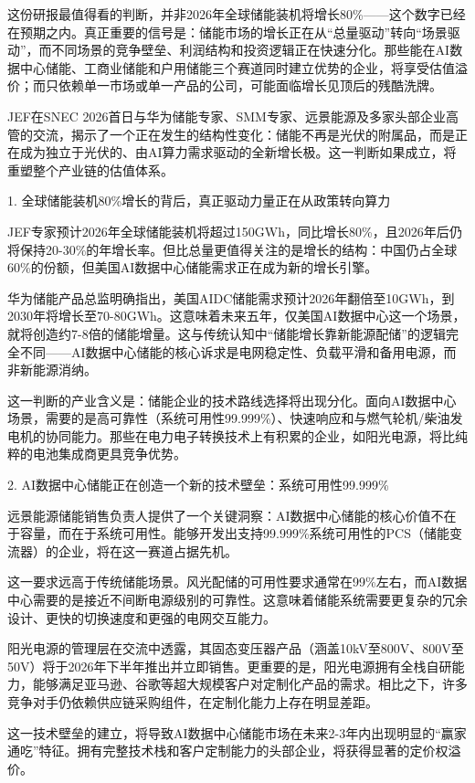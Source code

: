 \documentclass[11pt]{ctexart}
\begin{document}
这份研报最值得看的判断，并非2026年全球储能装机将增长80\%——这个数字已经在预期之内。真正重要的信号是：储能市场的增长正在从“总量驱动”转向“场景驱动”，而不同场景的竞争壁垒、利润结构和投资逻辑正在快速分化。那些能在AI数据中心储能、工商业储能和户用储能三个赛道同时建立优势的企业，将享受估值溢价；而只依赖单一市场或单一产品的公司，可能面临增长见顶后的残酷洗牌。

JEF在SNEC 2026首日与华为储能专家、SMM专家、远景能源及多家头部企业高管的交流，揭示了一个正在发生的结构性变化：储能不再是光伏的附属品，而是正在成为独立于光伏的、由AI算力需求驱动的全新增长极。这一判断如果成立，将重塑整个产业链的估值体系。

1. 全球储能装机80\%增长的背后，真正驱动力量正在从政策转向算力

JEF专家预计2026年全球储能装机将超过150GWh，同比增长80\%，且2026年后仍将保持20-30\%的年增长率。但比总量更值得关注的是增长的结构：中国仍占全球60\%的份额，但美国AI数据中心储能需求正在成为新的增长引擎。

华为储能产品总监明确指出，美国AIDC储能需求预计2026年翻倍至10GWh，到2030年将增长至70-80GWh。这意味着未来五年，仅美国AI数据中心这一个场景，就将创造约7-8倍的储能增量。这与传统认知中“储能增长靠新能源配储”的逻辑完全不同——AI数据中心储能的核心诉求是电网稳定性、负载平滑和备用电源，而非新能源消纳。

这一判断的产业含义是：储能企业的技术路线选择将出现分化。面向AI数据中心场景，需要的是高可靠性（系统可用性99.999\%）、快速响应和与燃气轮机/柴油发电机的协同能力。那些在电力电子转换技术上有积累的企业，如阳光电源，将比纯粹的电池集成商更具竞争优势。

2. AI数据中心储能正在创造一个新的技术壁垒：系统可用性99.999\%

远景能源储能销售负责人提供了一个关键洞察：AI数据中心储能的核心价值不在于容量，而在于系统可用性。能够开发出支持99.999\%系统可用性的PCS（储能变流器）的企业，将在这一赛道占据先机。

这一要求远高于传统储能场景。风光配储的可用性要求通常在99\%左右，而AI数据中心需要的是接近不间断电源级别的可靠性。这意味着储能系统需要更复杂的冗余设计、更快的切换速度和更强的电网交互能力。

阳光电源的管理层在交流中透露，其固态变压器产品（涵盖10kV至800V、800V至50V）将于2026年下半年推出并立即销售。更重要的是，阳光电源拥有全栈自研能力，能够满足亚马逊、谷歌等超大规模客户对定制化产品的需求。相比之下，许多竞争对手仍依赖供应链采购组件，在定制化能力上存在明显差距。

这一技术壁垒的建立，将导致AI数据中心储能市场在未来2-3年内出现明显的“赢家通吃”特征。拥有完整技术栈和客户定制能力的头部企业，将获得显著的定价权溢价。
\end{document}

